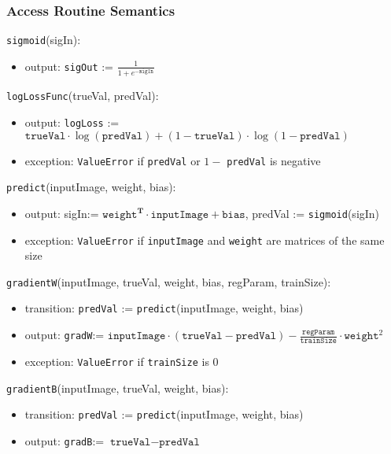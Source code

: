 \documentclass[12pt, titlepage]{article}
\def\code#1{\texttt{#1}}
\begin{document}
\subsubsection{Access Routine Semantics}

\noindent \code{sigmoid}(sigIn):
\begin{itemize}
\item output: \code{sigOut} := $\frac{1}{1 + e^{-\code{sigIn}}}$
\end{itemize}

\noindent \code{logLossFunc}(trueVal, predVal):
\begin{itemize}
\item output: \code{logLoss} := $\code{trueVal} \cdot \log(\code{predVal}) + (1 - \code{trueVal}) \cdot \log(1 - \code{predVal})$
\item exception: \code{ValueError} if \code{predVal} or $1 -$ \code{predVal} is negative
\end{itemize}

\noindent \code{predict}(inputImage, weight, bias):
\begin{itemize}
\item output: sigIn:= $\code{weight}^{\textbf{T}}\cdot\code{inputImage}+\code{bias}$, 
predVal := \code{sigmoid}(sigIn)
\item exception: \code{ValueError} if \code{inputImage} and \code{weight} are matrices of the same size
\end{itemize}

\noindent \code{gradientW}(inputImage, trueVal, weight, bias, regParam, trainSize):
\begin{itemize}
\item transition: \code{predVal} := \code{predict}(inputImage, weight, bias)
\item output: \code{gradW}:= $\code{inputImage}\cdot(\code{trueVal}-\code{predVal}) - \frac{\code{regParam}}{\code{trainSize}}\cdot\code{weight}^{2}$
\item exception: \code{ValueError} if \code{trainSize} is 0 
\end{itemize}

\noindent \code{gradientB}(inputImage, trueVal, weight, bias):
\begin{itemize}
  \item transition: \code{predVal} := \code{predict}(inputImage, weight, bias)
  \item output: \code{gradB}:= $\code{trueVal}-\code{predVal}$
\end{itemize}
\end{document}
